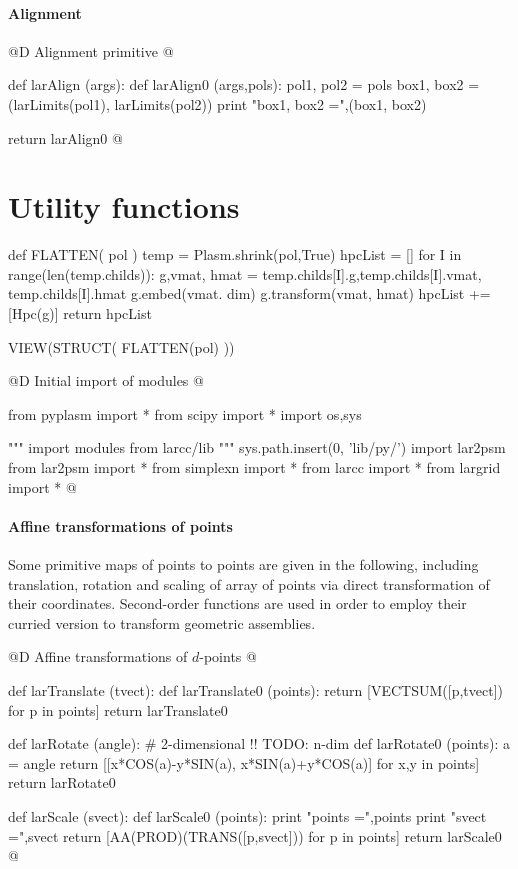 \documentclass[11pt,oneside]{article}	%
\begin{document}
\paragraph{Alignment}
@D Alignment primitive
@{def larAlign (args):
	def larAlign0 (args,pols):
		pol1, pol2 = pols
		box1, box2 = (larLimits(pol1), larLimits(pol2))
		print "box1, box2 =",(box1, box2)
		
	return larAlign0
@}

\appendix
\section{Utility functions}



def FLATTEN( pol )
	temp = Plasm.shrink(pol,True)
	hpcList = []
	for I in range(len(temp.childs)):			
		g,vmat, hmat = temp.childs[I].g,temp.childs[I].vmat, temp.childs[I].hmat
		g.embed(vmat. dim)
		g.transform(vmat, hmat)
		hpcList += [Hpc(g)]
	return hpcList
	
VIEW(STRUCT( FLATTEN(pol) ))


@D Initial import of modules
@{from pyplasm import *
from scipy import *
import os,sys

""" import modules from larcc/lib """
sys.path.insert(0, 'lib/py/')
import lar2psm
from lar2psm import *
from simplexn import *
from larcc import *
from largrid import *
@}


\paragraph{Affine transformations of points} Some primitive maps of points to points are given in the following, including translation, rotation and scaling of array of points via direct transformation of their coordinates. Second-order functions are used in order to employ their curried version to transform geometric assemblies.

@D Affine transformations of $d$-points
@{def larTranslate (tvect):
	def larTranslate0 (points):
		return [VECTSUM([p,tvect]) for p in points]
	return larTranslate0

def larRotate (angle):		# 2-dimensional !! TODO: n-dim
	def larRotate0 (points):
		a = angle
		return [[x*COS(a)-y*SIN(a), x*SIN(a)+y*COS(a)] for x,y in points]
	return larRotate0

def larScale (svect):
	def larScale0 (points):
		print "\n points =",points
		print "\n svect =",svect
		return [AA(PROD)(TRANS([p,svect])) for p in points]
	return larScale0
@}
\end{document}
